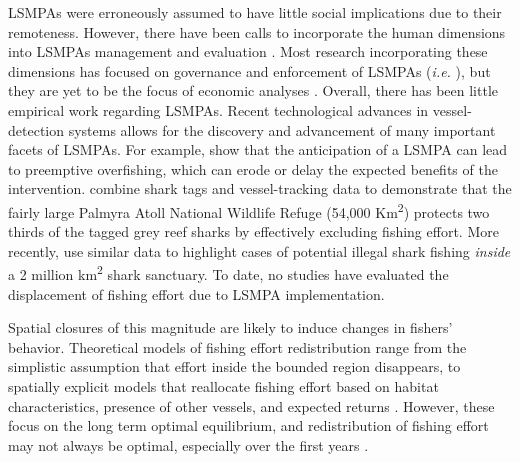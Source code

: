 \documentclass[11pt,]{article}
\begin{document}
LSMPAs were erroneously assumed to have little social implications due
to their remoteness. However, there have been calls to incorporate the
human dimensions into LSMPAs management and evaluation
\citep{agardy_2011,gray_2017}. Most research incorporating these
dimensions has focused on governance and enforcement of LSMPAs
(\emph{i.e.} \citet{alger_2017,christie_2017}), but they are yet to be
the focus of economic analyses \citep{gray_2017}. Overall, there has
been little empirical work regarding LSMPAs. Recent technological
advances in vessel-detection systems allows for the discovery and
advancement of many important facets of LSMPAs. For example,
\citep{mcdermott_2018} show that the anticipation of a LSMPA can lead to
preemptive overfishing, which can erode or delay the expected benefits
of the intervention. \citet{white_2017} combine shark tags and
vessel-tracking data to demonstrate that the fairly large Palmyra Atoll
National Wildlife Refuge (54,000 Km\textsuperscript{2}) protects two
thirds of the tagged grey reef sharks by effectively excluding fishing
effort. More recently, \citep{bradley_2018} use similar data to
highlight cases of potential illegal shark fishing \emph{inside} a 2
million km\textsuperscript{2} shark sanctuary. To date, no studies have
evaluated the displacement of fishing effort due to LSMPA
implementation.

Spatial closures of this magnitude are likely to induce changes in
fishers' behavior. Theoretical models of fishing effort redistribution
range from the simplistic assumption that effort inside the bounded
region disappears, to spatially explicit models that reallocate fishing
effort based on habitat characteristics, presence of other vessels, and
expected returns \citep{smith_2003,hilborn_2006}. However, these focus
on the long term optimal equilibrium, and redistribution of fishing
effort may not always be optimal, especially over the first years
\citep{stevenson_2013}.
\end{document}
